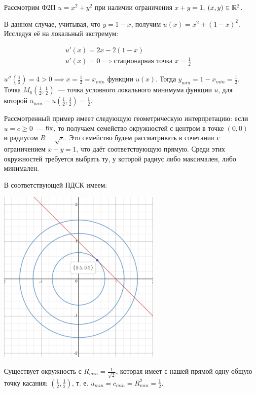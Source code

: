 \documentclass[../../main.tex]{subfiles}
\begin{document}
\begin{example}
	\;
	
	Рассмотрим Ф2П $u = x^2 + y^2$ при наличии ограничения
	$x + y = 1$, $(x, y) \in \mathbb{R}^2$.
	
	В данном случае, учитывая, что $y = 1 - x$, получим
	$u(x) = x^2 + (1-x)^2$. Исследуя её на локальный экстремум:
	
    \[\begin{array}{c}
	u'(x) = 2x - 2(1-x) \\
	u'(x) = 0 \implies \text{стационарная точка }x = \frac{1}{2}
	\end{array}\]
	
	$u''(\frac{1}{2}) = 4 > 0 \implies x = \frac{1}{2} = x_{min}$ функции $u(x)$.
	Тогда $y_{min} = 1 - x_{min} = \frac12$. 
	Точка 
	$M_0( \frac{1}{2}, \frac{1}{2})$~--- точка 
	условного локального минимума функции $u$, для которой 
	$u_{min} = u( \frac{1}{2}, \frac{1}{2} ) = \frac{1}{2}$. 
	
	Рассмотренный пример имеет следующую геометрическую интерпретацию:
	если $u = c \ge 0$~--- $\operatorname{fix}$, то получаем семейство 
	окружностей с центром в точке $(0, 0)$ и радиусом $R = \sqrt{c}$.
	Это семейство будем рассматривать в сочетании с ограничением
	$x + y = 1$, что даёт соответствующую прямую.
	Среди этих окружностей требуется выбрать ту, у которой 
	радиус либо максимален, либо минимален.
	
	В соответствующей ПДСК имеем:
	
	\begin{center}
	\includegraphics[width=0.6\textwidth]{family_of_circles.png}
    \end{center}
	
	Существует окружность с $R_{min} = \frac{1}{ \sqrt{2} }$, 
	которая имеет с нашей прямой одну общую точку касания: 
	$\left( \frac{1}{2}, \frac{1}{2} \right)$, т. е.
	$u_{min} = c_{min} = R^2_{min} = \frac{1}{2}$.
\end{example}
\end{document}
